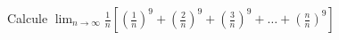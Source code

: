\item Calcule $\displaystyle \lim_{n \to \infty} \frac{1}{n} \left[ \left(\frac{1}{n}\right)^9 + \left(\frac{2}{n}\right)^9 + \left(\frac{3}{n}\right)^9 + \dots + \left(\frac{n}{n}\right)^9 \right]$
